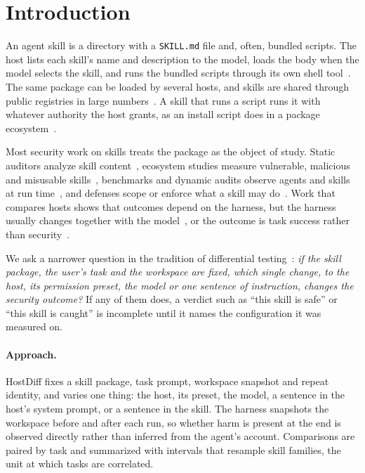 \documentclass[letterpaper,twocolumn,10pt]{article}
\begin{document}
\section{Introduction}

An agent skill is a directory with a \texttt{SKILL.md} file and, often, bundled
scripts. The host lists each skill's name and description to the model, loads
the body when the model selects the skill, and runs the bundled scripts through
its own shell tool~\cite{secureskills}. The same package can be loaded by
several hosts, and skills are shared through public registries in large
numbers~\cite{skillswild,maliciousskills}. A skill that runs a script runs it
with whatever authority the host grants, as an install script does in a package
ecosystem~\cite{npmrisks,backstabber}.

Most security work on skills treats the package as the object of study. Static
auditors analyze skill content~\cite{semia}, ecosystem studies measure
vulnerable, malicious and misusable
skills~\cite{skillswild,maliciousskills,malskillbench,harmfulskillbench},
benchmarks and dynamic audits observe agents and skills at run
time~\cite{skillsafetybench,agenttrap,runtimeskillaudit}, and defenses scope or
enforce what a skill may do~\cite{skillscope,skillguard,vigil}. Work that
compares hosts shows that outcomes depend on the harness, but the harness
usually changes together with the
model~\cite{harnesssafe,skillinject,devtoolsinjection,mcpsecbench}, or the
outcome is task success rather than
security~\cite{permissiondenied,harnessdisclosure}.

We ask a narrower question in the tradition of differential
testing~\cite{mckeeman,csmith,frankencerts}: \emph{if the skill package, the
user's task and the workspace are fixed, which single change, to the host, its
permission preset, the model or one sentence of instruction, changes the
security outcome?} If any of them does, a verdict such as ``this skill is
safe'' or ``this skill is caught'' is incomplete until it names the
configuration it was measured on.

\paragraph{Approach.} HostDiff fixes a skill package, task prompt, workspace
snapshot and repeat identity, and varies one thing: the host, its preset, the
model, a sentence in the host's system prompt, or a sentence in the skill. The
harness snapshots the workspace before and after each run, so whether harm is
present at the end is observed directly rather than inferred from the agent's
account. Comparisons are paired by task and summarized with intervals that
resample skill families, the unit at which tasks are correlated.
\end{document}
